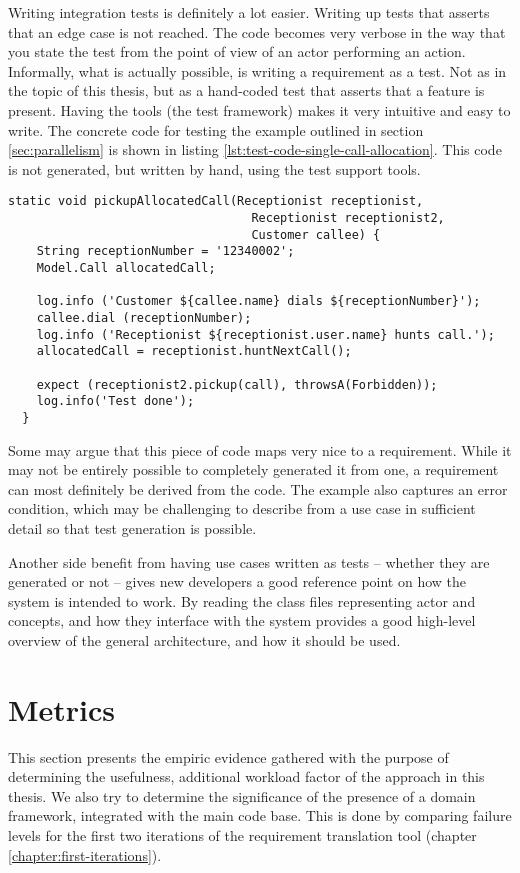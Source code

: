 Writing integration tests is definitely a lot easier. Writing up tests that asserts that an edge case is not reached. The code becomes very verbose in the way that you state the test from the point of view of an actor performing an action. Informally, what is actually possible, is writing a requirement as a test. Not as in the topic of this thesis, but as a hand-coded test that asserts that a feature is present. Having the tools (the test framework) makes it very intuitive and easy to write. The concrete code for testing the example outlined in section \ref{sec:parallelism} is shown in listing \ref{lst:test-code-single-call-allocation}. This code is not generated, but written by hand, using the test support tools.
\begin{lstlisting}[style=Dart, caption=Test code for single call allocation,label={lst:test-code-single-call-allocation}]
  static void pickupAllocatedCall(Receptionist receptionist, 
                                  Receptionist receptionist2, 
                                  Customer callee) {
    String receptionNumber = '12340002';
    Model.Call allocatedCall;
    
    log.info ('Customer ${callee.name} dials ${receptionNumber}');
    callee.dial (receptionNumber);
    log.info ('Receptionist ${receptionist.user.name} hunts call.');
    allocatedCall = receptionist.huntNextCall();
   
    expect (receptionist2.pickup(call), throwsA(Forbidden));
    log.info('Test done');
  }
\end{lstlisting}
Some may argue that this piece of code maps very nice to a requirement. While it may not be entirely possible to completely generated it from one, a requirement can most definitely be derived from the code. The example also captures an error condition, which may be challenging to describe from a use case in sufficient detail so that test generation is possible.\medskip

\noindent Another side benefit from having use cases written as tests -- whether they are generated or not -- gives new developers a good reference point on how the system is intended to work. By reading the class files representing actor and concepts, and how they interface with the system provides a good high-level overview of the general architecture, and how it should be used.

\section{Metrics}
This section presents the empiric evidence gathered with the purpose of determining the usefulness, additional workload factor of the approach in this thesis. We also try to determine the significance of the presence of a domain framework, integrated with the main code base. This is done by comparing failure levels for the first two iterations of the requirement translation tool (chapter \ref{chapter:first-iterations}).
